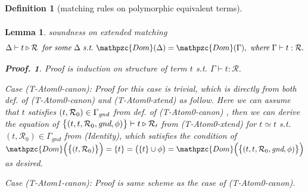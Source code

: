 \documentclass[12pt]{article}
\newtheorem{Definition}{Definition}[section]
\newtheorem{Lemma}{Lemma}[section]
\newtheorem{Proof}{Proof.}
\begin{document}
\begin{Definition}[matching rules on polymorphic equivalent terms]
\begin{displaymath}
\begin{array}{c}
    \end{array}
  \end{displaymath}
\end{Definition}


\begin{Lemma}{soundness on extended matching}
  \label{soundness_on_extended_matching}
  \[ \Delta \vdash t \triangleright \mathcal{R}\;\; \text{\it for some}\
      \Delta\ \text{\it s.t.}\
       \mathpzc{Dom}(\Delta) = \mathpzc{Dom}(\Gamma),\
        \text{\it where}\ \Gamma \vdash t : \mathcal{R}.
  \]
  \begin{Proof}
    Proof is induction on structure of term $t$ s.t.
    $\Gamma \vdash t : \mathcal{R}$.

    Case (T-Atom0-canon): Proof for this case is trivial, which is directly
    from both def. of (T-Atom0-canon) and (T-Atom0-xtend) as follow.
    Here we can assume that $t$ satisfies $(t, \mathcal{R}_0) \in
    \Gamma_\text{\it gnd}$ from def. of (T-Atom0-canon) , then we can
    derive the equation of
    $\bigl\{(t, t, \mathcal{R}_0, \text{\it gnd}, \phi) \bigr\} \vdash
    t \triangleright \mathcal{R_0}$ from (T-Atom0-xtend) for
    $t \simeq t$ s.t. $(t, \mathcal{R}_0) \in \Gamma_{gnd}$ from (Identity),
    which satisfies the condition of
    $\mathpzc{Dom}\Bigl(\bigl\{(t, \mathcal{R}_0 ) \bigr\} \Bigr) =
    \{t\} = \bigl(\{t\} \cup \phi \bigr) =
    \mathpzc{Dom}\Bigl(\bigl\{(t, t, \mathcal{R}_0, \text{\it gnd}, \phi)
    \bigr\} \Bigr)$ as desired.
    
    Case (T-Atom1-canon): Proof is same scheme as the case of
    (T-Atom0-canon).
    

\end{Proof}
\end{Lemma}
\end{document}
